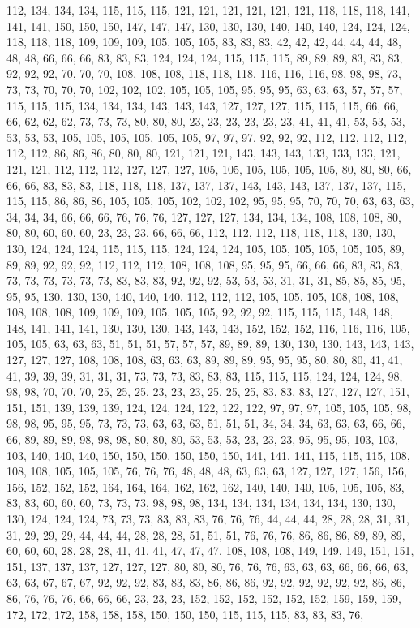 112, 134, 134, 134, 115, 115, 115, 121, 121, 121, 121, 121, 121, 118, 118, 118, 141, 141, 141, 150, 150, 150, 147, 147, 147, 130, 130, 130, 140, 140, 140, 124, 124, 124, 118, 118, 118, 109, 109, 109, 105, 105, 105, 83, 83, 83, 42, 42, 42, 44, 44, 44, 48, 48, 48, 66, 66, 66, 83, 83, 83, 124, 124, 124, 115, 115, 115, 89, 89, 89, 83, 83, 83, 92, 92, 92, 70, 70, 70, 108, 108, 108, 118, 118, 118, 116, 116, 116, 98, 98, 98, 73, 73, 73, 70, 70, 70, 102, 102, 102, 105, 105, 105, 95, 95, 95, 63, 63, 63, 57, 57, 57, 115, 115, 115, 134, 134, 134, 143, 143, 143, 127, 127, 127, 115, 115, 115, 66, 66, 66, 62, 62, 62, 73, 73, 73, 80, 80, 80, 23, 23, 23, 23, 23, 23, 41, 41, 41, 53, 53, 53, 53, 53, 53, 105, 105, 105, 105, 105, 105, 97, 97, 97, 92, 92, 92, 112, 112, 112, 112, 112, 112, 86, 86, 86, 80, 80, 80, 121, 121, 121, 143, 143, 143, 133, 133, 133, 121, 121, 121, 112, 112, 112, 127, 127, 127, 105, 105, 105, 105, 105, 105, 80, 80, 80, 66, 66, 66, 83, 83, 83, 118, 118, 118, 137, 137, 137, 143, 143, 143, 137, 137, 137, 115, 115, 115, 86, 86, 86, 105, 105, 105, 102, 102, 102, 95, 95, 95, 70, 70, 70, 63, 63, 63, 34, 34, 34, 66, 66, 66, 76, 76, 76, 127, 127, 127, 134, 134, 134, 108, 108, 108, 80, 80, 80, 60, 60, 60, 23, 23, 23, 66, 66, 66, 112, 112, 112, 118, 118, 118, 130, 130, 130, 124, 124, 124, 115, 115, 115, 124, 124, 124, 105, 105, 105, 105, 105, 105, 89, 89, 89, 92, 92, 92, 112, 112, 112, 108, 108, 108, 95, 95, 95, 66, 66, 66, 83, 83, 83, 73, 73, 73, 73, 73, 73, 83, 83, 83, 92, 92, 92, 53, 53, 53, 31, 31, 31, 85, 85, 85, 95, 95, 95, 130, 130, 130, 140, 140, 140, 112, 112, 112, 105, 105, 105, 108, 108, 108, 108, 108, 108, 109, 109, 109, 105, 105, 105, 92, 92, 92, 115, 115, 115, 148, 148, 148, 141, 141, 141, 130, 130, 130, 143, 143, 143, 152, 152, 152, 116, 116, 116, 105, 105, 105, 63, 63, 63, 51, 51, 51, 57, 57, 57, 89, 89, 89, 130, 130, 130, 143, 143, 143, 127, 127, 127, 108, 108, 108, 63, 63, 63, 89, 89, 89, 95, 95, 95, 80, 80, 80, 41, 41, 41, 39, 39, 39, 31, 31, 31, 73, 73, 73, 83, 83, 83, 115, 115, 115, 124, 124, 124, 98, 98, 98, 70, 70, 70, 25, 25, 25, 23, 23, 23, 25, 25, 25, 83, 83, 83, 127, 127, 127, 151, 151, 151, 139, 139, 139, 124, 124, 124, 122, 122, 122, 97, 97, 97, 105, 105, 105, 98, 98, 98, 95, 95, 95, 73, 73, 73, 63, 63, 63, 51, 51, 51, 34, 34, 34, 63, 63, 63, 66, 66, 66, 89, 89, 89, 98, 98, 98, 80, 80, 80, 53, 53, 53, 23, 23, 23, 95, 95, 95, 103, 103, 103, 140, 140, 140, 150, 150, 150, 150, 150, 150, 141, 141, 141, 115, 115, 115, 108, 108, 108, 105, 105, 105, 76, 76, 76, 48, 48, 48, 63, 63, 63, 127, 127, 127, 156, 156, 156, 152, 152, 152, 164, 164, 164, 162, 162, 162, 140, 140, 140, 105, 105, 105, 83, 83, 83, 60, 60, 60, 73, 73, 73, 98, 98, 98, 134, 134, 134, 134, 134, 134, 130, 130, 130, 124, 124, 124, 73, 73, 73, 83, 83, 83, 76, 76, 76, 44, 44, 44, 28, 28, 28, 31, 31, 31, 29, 29, 29, 44, 44, 44, 28, 28, 28, 51, 51, 51, 76, 76, 76, 86, 86, 86, 89, 89, 89, 60, 60, 60, 28, 28, 28, 41, 41, 41, 47, 47, 47, 108, 108, 108, 149, 149, 149, 151, 151, 151, 137, 137, 137, 127, 127, 127, 80, 80, 80, 76, 76, 76, 63, 63, 63, 66, 66, 66, 63, 63, 63, 67, 67, 67, 92, 92, 92, 83, 83, 83, 86, 86, 86, 92, 92, 92, 92, 92, 92, 86, 86, 86, 76, 76, 76, 66, 66, 66, 23, 23, 23, 152, 152, 152, 152, 152, 152, 159, 159, 159, 172, 172, 172, 158, 158, 158, 150, 150, 150, 115, 115, 115, 83, 83, 83, 76, 